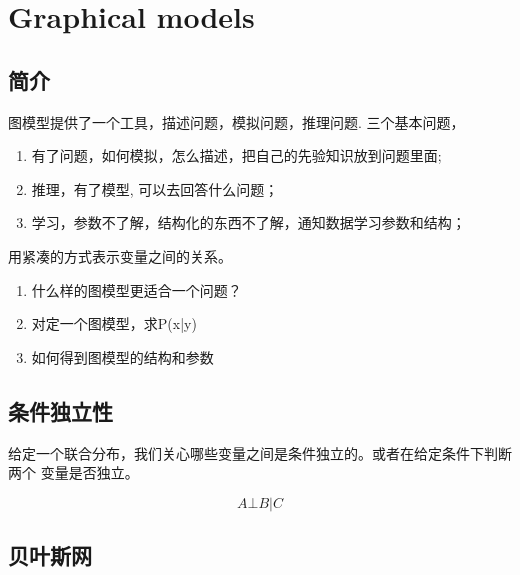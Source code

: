 \chapter{Graphical models}
\section{简介}
图模型提供了一个工具，描述问题，模拟问题，推理问题\cite{longxing2012machinelearning}.
三个基本问题，
\begin{enumerate}
\item 有了问题，如何模拟，怎么描述，把自己的先验知识放到问题里面; 
\item 推理，有了模型, 可以去回答什么问题；
\item 学习，参数不了解，结构化的东西不了解，通知数据学习参数和结构；
\end{enumerate}
用紧凑的方式表示变量之间的关系。
\begin{enumerate}
\item 什么样的图模型更适合一个问题？
\item 对定一个图模型，求P(x|y)
\item 如何得到图模型的结构和参数
\end{enumerate}

\section{条件独立性}
给定一个联合分布，我们关心哪些变量之间是条件独立的。或者在给定条件下判断两个
变量是否独立。

\begin{equation}
A\bot B | C
\end{equation}
\section{贝叶斯网}
